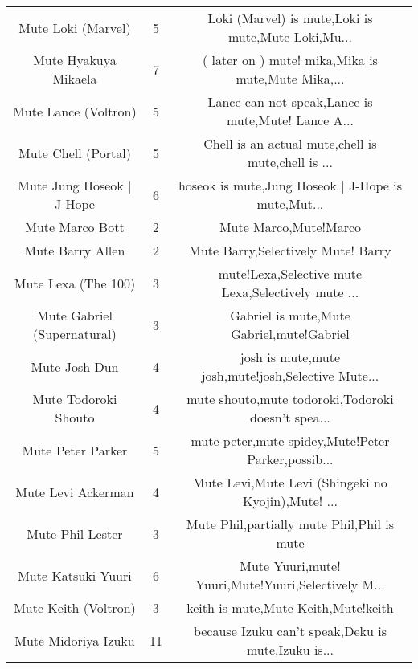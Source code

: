 \begin{table}[h!]
{\begin{tabular}{|c|c|c|}
                                Mute Loki (Marvel) &      5 & Loki (Marvel) is mute,Loki is mute,Mute Loki,Mu... \\
                              Mute Hyakuya Mikaela &      7 & ( later on ) mute! mika,Mika is mute,Mute Mika,... \\
                              Mute Lance (Voltron) &      5 & Lance can not speak,Lance is mute,Mute! Lance A... \\
                               Mute Chell (Portal) &      5 & Chell is an actual mute,chell is mute,chell is ... \\
                         Mute Jung Hoseok | J-Hope &      6 & hoseok is mute,Jung Hoseok | J-Hope is mute,Mut... \\
                                   Mute Marco Bott &      2 &                              Mute Marco,Mute!Marco \\
                                  Mute Barry Allen &      2 &                 Mute Barry,Selectively Mute! Barry \\
                               Mute Lexa (The 100) &      3 & mute!Lexa,Selective mute Lexa,Selectively mute ... \\
                       Mute Gabriel (Supernatural) &      3 &          Gabriel is mute,Mute Gabriel,mute!Gabriel \\
                                     Mute Josh Dun &      4 & josh is mute,mute josh,mute!josh,Selective Mute... \\
                              Mute Todoroki Shouto &      4 & mute shouto,mute todoroki,Todoroki doesn't spea... \\
                                 Mute Peter Parker &      5 & mute peter,mute spidey,Mute!Peter Parker,possib... \\
                                Mute Levi Ackerman &      4 & Mute Levi,Mute Levi (Shingeki no Kyojin),Mute! ... \\
                                  Mute Phil Lester &      3 &         Mute Phil,partially mute Phil,Phil is mute \\
                                Mute Katsuki Yuuri &      6 & Mute Yuuri,mute! Yuuri,Mute!Yuuri,Selectively M... \\
                              Mute Keith (Voltron) &      3 &                keith is mute,Mute Keith,Mute!keith \\
                               Mute Midoriya Izuku &     11 & because Izuku can't speak,Deku is mute,Izuku is... \\

\end{tabular}}
\end{table}
